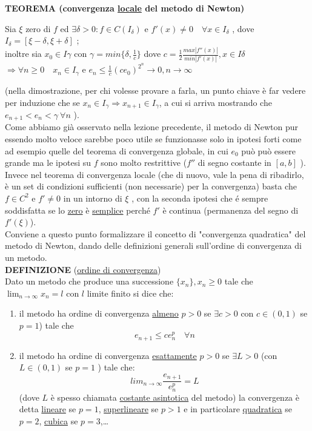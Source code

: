 \documentclass[12pt]{article}
\begin{document}
\textbf{TEOREMA (convergenza \underline{locale} del metodo di Newton)}
\begin{center}
Sia $\xi$ zero di $f$ ed $ \exists \delta >0: f\in C(I_\delta)$ e  $f'(x) \neq 0  \quad \forall x \in I_\delta$ , dove $ I_\delta =[\xi-\delta,\xi+\delta]$ ;\\ inoltre sia $ x_0 \in  I\gamma$  con  $\gamma=min \lbrace\delta, \frac{1}{c}\rbrace$  dove $c=\frac{1}{2}\frac{max|f''(x)|}{min|f'(x)|}, x\in I\delta $ \\
$\Rightarrow \forall n \geq 0 \quad x_n \in I_\gamma$ e $e_n \leq \frac{1}{c} (ce_0)^{2^n} \to 0, n\to \infty$
\end{center}
\vspace{0.5cm}
(nella dimostrazione, per chi volesse provare a farla, un punto chiave è far vedere per induzione che se $x_n \in I_\gamma \Rightarrow x_{n+1}\in I_\gamma$, a cui si arriva mostrando che  $e_{n+1}<e_n<\gamma \ \forall n$ ).\\
Come abbiamo già osservato nella lezione precedente, il metodo di Newton pur essendo molto veloce sarebbe poco utile se funzionasse solo in ipotesi forti come ad esempio quelle del teorema di convergenza globale, in cui $e_0$ può può essere grande ma le ipotesi su $f$ sono molto restrittive ($f''$ di segno costante in $[a,b]$ ).\\
Invece nel teorema di convergenza locale  (che di nuovo, vale la pena di ribadirlo, è un set di condizioni sufficienti (non necessarie) per la convergenza) basta che $ f\in C^2$  e  $ f'\neq 0 $ in un intorno di  $ \xi $ , con la seconda ipotesi che é sempre soddisfatta se lo \underline{zero} è \underline{semplice} perché $f'$ è continua (permanenza del segno di $f'(\xi)$).\\
Conviene a questo punto formalizzare il concetto di "convergenza quadratica" del metodo di Newton, dando delle definizioni generali sull'ordine di convergenza di un metodo. \\
\textbf{DEFINIZIONE} (\underline{ordine di convergenza})\\
Dato un metodo che produce una successione $\lbrace x_n\rbrace, x_n\geq 0 $  tale che $\lim_{n \to \infty}x_n=l $  con $l$ limite finito si dice che: 
\begin{enumerate}
\item  il metodo ha ordine di convergenza \underline{almeno} $p>0$ se $ \exists c>0$ con $ c \in (0,1) $ se $p=1$) tale che 
\begin{equation*}
    e_{n+1}\leq ce_n^p \quad \forall n
\end{equation*}
\item  il metodo ha ordine di convergenza \underline{esattamente} $p>0$ se  $\exists  L>0$ (con $ L\in (0,1)$ se $p=1$ ) tale che:
\begin{equation*}
    lim_{n\to\infty}\frac{e_{n+1}}{e_n^p}=L
\end{equation*}
(dove $L$ è spesso chiamata \underline{costante asintotica} del metodo) la convergenza è detta \underline{lineare} se $p=1$, \underline{superlineare} se $p>1$ e in particolare \underline{quadratica} se $p=2$,  \underline{cubica} se $p=3$,\dots
\end{enumerate}
\end{document}
